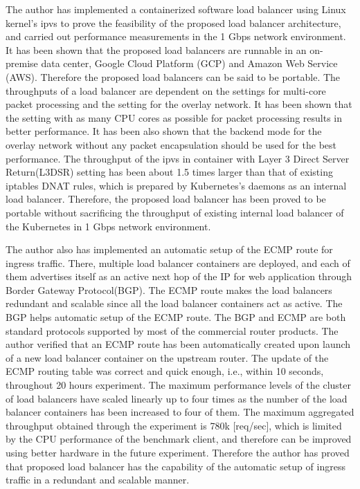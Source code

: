 The author has implemented a containerized software load balancer using Linux kernel's ipvs to prove the feasibility of the proposed load balancer architecture, and carried out performance measurements in the 1 Gbps network environment.
It has been shown that the proposed load balancers are runnable in an on-premise data center, Google Cloud Platform (GCP) and Amazon Web Service (AWS).
Therefore the proposed load balancers can be said to be portable.
%
The throughputs of a load balancer are dependent on the settings for multi-core packet processing and the setting for the overlay network.
It has been shown that the setting with as many CPU cores as possible for packet processing results in better performance.
It has been also shown that the backend mode for the overlay network without any packet encapsulation should be used for the best performance.
%
The throughput of the ipvs in container with Layer 3 Direct Server Return(L3DSR) setting has been about 1.5 times larger than that of existing iptables DNAT rules, which is prepared by Kubernetes's daemons as an  internal load balancer.
Therefore, the proposed load balancer has been proved to be portable without sacrificing the throughput of existing internal load balancer of the Kubernetes in 1 Gbps network environment.

The author also has implemented an automatic setup of the ECMP route for ingress traffic.
There, multiple load balancer containers are deployed, and each of them advertises itself as an active next hop of the IP for web application through Border Gateway Protocol(BGP).
The ECMP route makes the load balancers redundant and scalable since all the load balancer containers act as active.
The BGP helps automatic setup of the ECMP route.  
The BGP and ECMP are both standard protocols supported by most of the commercial router products.
%
The author verified that an ECMP route has been automatically created upon launch of a new load balancer container on the upstream router.
The update of the ECMP routing table was correct and quick enough, i.e., within 10 seconds, throughout 20 hours experiment.
The maximum performance levels of the cluster of load balancers have scaled linearly up to four times as the number of the load balancer containers has been increased to four of them.
The maximum aggregated throughput obtained through the experiment is 780k [req/sec], which is limited by the CPU performance of the benchmark client, and therefore can be improved using better hardware in the future experiment.
Therefore the author has proved that proposed load balancer has the capability of the automatic setup of ingress traffic in a redundant and scalable manner.

